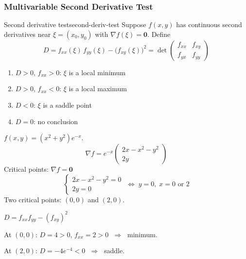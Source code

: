\subsubsection{Multivariable Second Derivative Test}

\begin{theorem}{Second derivative test}{second-deriv-test}
  Suppose $f(x,y)$ has continuous second derivatives near
  $\xi=(x_{0},y_{0})$ with $\nabla f(\xi)=\mathbf{0}$.
  Define
  \[
    D = f_{xx}(\xi)\,f_{yy}(\xi)-\bigl(f_{xy}(\xi)\bigr)^{2}
    = \det
    \begin{pmatrix}
      f_{xx} & f_{xy} \\f_{yx}&f_{yy}
    \end{pmatrix}
  \]
  \begin{enumerate}[nosep]
    \item $D>0$, $f_{xx}>0$: $\xi$ is a local minimum
    \item $D>0$, $f_{xx}<0$: $\xi$ is a local maximum
    \item $D<0$: $\xi$ is a saddle point
    \item $D=0$: no conclusion
  \end{enumerate}
\end{theorem}

\begin{example}
  $f(x,y)=(x^{2}+y^{2})e^{-x}$.
  \[
    \nabla f
    = e^{-x}
    \begin{pmatrix}
      2x-x^{2}-y^{2} \\2y
    \end{pmatrix}
  \]
  Critical points: $\nabla f=\mathbf{0}$
  \[
    \begin{cases}
      2x-x^{2}-y^{2}=0 \\2y=0
    \end{cases}
    \;\Longleftrightarrow\;
    y=0,\; x=0\text{ or }2
  \]
  Two critical points: $(0,0)$ and $(2,0)$.

  $D = f_{xx}f_{yy}-(f_{xy})^{2}$

  At $(0,0)$: $D=4>0$, $f_{xx}=2>0$ $\;\Longrightarrow\;$ minimum.

  At $(2,0)$: $D=-4e^{-4}<0$ $\;\Longrightarrow\;$ saddle.
\end{example}

